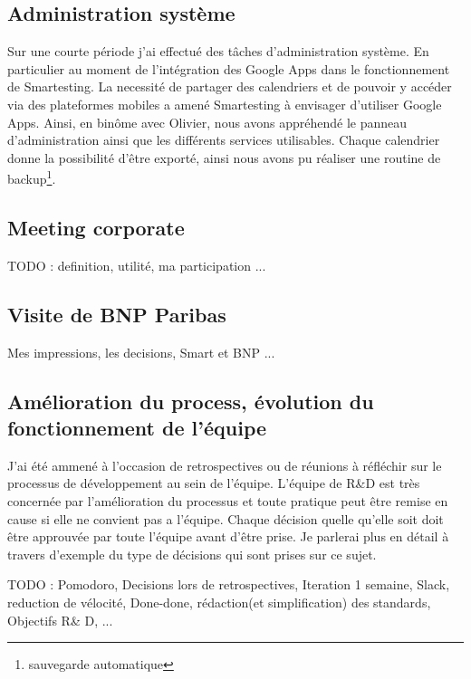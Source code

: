 \subsection{Administration système}
Sur une courte période j'ai effectué des t\^aches d'administration système. En particulier au moment de l'intégration des Google Apps dans le fonctionnement de Smartesting. La necessité de partager des calendriers et de pouvoir y accéder via des plateformes mobiles a amené Smartesting à envisager d'utiliser Google Apps. Ainsi, en binôme avec Olivier, nous avons appréhendé le panneau d'administration ainsi que les différents services utilisables. Chaque calendrier donne la possibilité d'être exporté, ainsi nous avons pu réaliser une routine de backup\footnote{sauvegarde automatique}.
\subsection{Meeting corporate}
TODO : definition, utilité, ma participation ...
\subsection{Visite de BNP Paribas}
Mes impressions, les decisions, Smart et BNP ...

\subsection{Amélioration du process, évolution du fonctionnement de l'équipe}
J'ai été ammené à l'occasion de retrospectives ou de réunions à réfléchir sur le processus de développement au sein de l'équipe. L'équipe de R\&D est très concernée par l'amélioration du processus et toute pratique peut être remise en cause si elle ne convient pas a l'équipe. Chaque décision quelle qu'elle soit doit être approuvée par toute l'équipe avant d'être prise. Je parlerai plus en détail à travers d'exemple du type de décisions qui sont prises sur ce sujet.



TODO : Pomodoro, Decisions lors de retrospectives, Iteration 1 semaine, Slack, reduction de vélocité, Done-done, rédaction(et simplification) des standards, Objectifs R\& D, ...